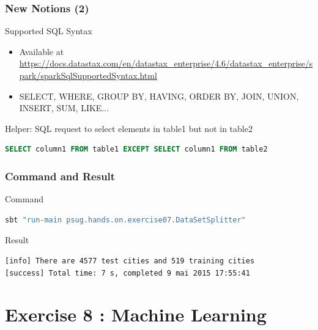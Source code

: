 \documentclass[slidetop,9pt,utf8]{beamer}
\begin{document}
\begin{frame}[fragile]
  \frametitle{New Notions (2)}

  \begin{block}{Supported SQL Syntax}
    \begin{itemize}
      \item Available at \tiny\href{http://docs.datastax.com/en/datastax\_enterprise/4.6/datastax\_enterprise/spark/sparkSqlSupportedSyntax.html}{https://docs.datastax.com/en/datastax\_enterprise/4.6/datastax\_enterprise/spark/sparkSqlSupportedSyntax.html}\normalsize
      \item SELECT, WHERE, GROUP BY, HAVING, ORDER BY, JOIN, UNION, INSERT, SUM, LIKE...
    \end{itemize}
  \end{block}

  \begin{block}{Helper: SQL request to select elements in table1 but not in table2}
    \begin{lstlisting}[language=sql]
SELECT column1 FROM table1 EXCEPT SELECT column1 FROM table2
    \end{lstlisting}
  \end{block}

\end{frame}

\begin{frame}[fragile]
  \frametitle{Command and Result}

  \begin{block}{Command}
    \begin{lstlisting}[language=bash, style=terminal-medium]
sbt "run-main psug.hands.on.exercise07.DataSetSplitter"  
    \end{lstlisting}
  \end{block}

  \begin{block}{Result}
    \begin{lstlisting}[style=terminal]
[info] There are 4577 test cities and 519 training cities
[success] Total time: 7 s, completed 9 mai 2015 17:55:41
    \end{lstlisting}
  \end{block}

\end{frame}

%
%
%
%

\section{Exercise 8 : Machine Learning}
\end{document}
